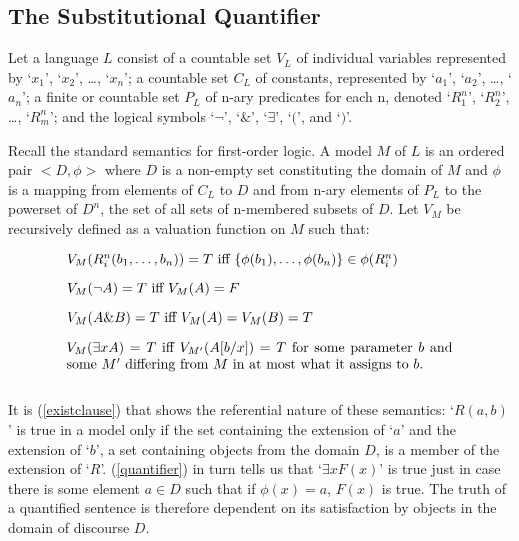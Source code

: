 \documentclass[12pt,letterpaper]{article}
\newenvironment{te}
{\begin{singlespace}
\begin{equation}
\begin{minipage}[t]{0.8\linewidth}}
{\end{minipage}
\end{equation}
\end{singlespace}
\ignorespacesafterend}
\begin{document}
\begin{doublespace}
\section{The Substitutional Quantifier} 

Let a language $L$ consist of a countable set $V_L$ of individual
variables represented by `$x_1$', `$x_2$', \ldots, `$x_n$'; a
countable set $C_L$ of constants, represented by `$a_1$', `$a_2$',
\ldots, `$a_n$'; a finite or countable set $P_L$ of n-ary predicates for
each n, denoted `$R^n_1$', `$R^n_2$', \ldots, `$R^n_m$'; and the
logical symbols `$\neg$', `$\&$', `$\exists$', `$($', and `$)$'.

Recall the standard semantics for first-order logic.  A model $M$ of
$L$ is an ordered pair $<D,\phi>$ where $D$ is a non-empty set
constituting the domain of $M$ and $\phi$ is a mapping from elements
of $C_L$ to $D$ and from n-ary elements of $P_L$ to the powerset of $D^n$,
the set of all sets of n-membered subsets of $D$.  Let $V_M$ be
recursively defined as a valuation function on $M$ such that:

\begin{te}
  $V_M(R^n_i(b_1,\ldots ,b_n)) = T$ iff $\{ \phi(b_1),\ldots ,\phi(b_n) \} \in
  \phi(R^n_i)$
\label{existclause}
\end{te}

\begin{te}
  $V_M(\neg A) = T$ iff $V_M(A) = F$
\end{te}

\begin{te}
  $V_M(A \& B) = T$ iff $V_M(A) = V_M(B) = T$
\end{te}

\begin{te}
  $V_M(\exists xA) = T$ iff $V_{M'}(A[b/x]) = T$ for some
  parameter $b$ and some $M'$ differing from $M$ in at most what it
  assigns to $b$.\\
\label{quantifier}
\end{te}

It is (\ref{existclause}) that shows the referential nature of these
semantics: `$R(a,b)$' is true in a model only if the set containing the
extension of `$a$' and the extension of `$b$', a set containing objects
from the domain $D$, is a member of the extension of
`$R$'. (\ref{quantifier}) in turn tells us that `$\exists xF(x)$' is true
just in case there is some element $a \in D$ such that if $\phi(x) =
{a}$, $F(x)$ is true.  The truth of a quantified sentence is therefore
dependent on its satisfaction by objects in the domain of discourse $D$.


\end{doublespace}
\end{document}
